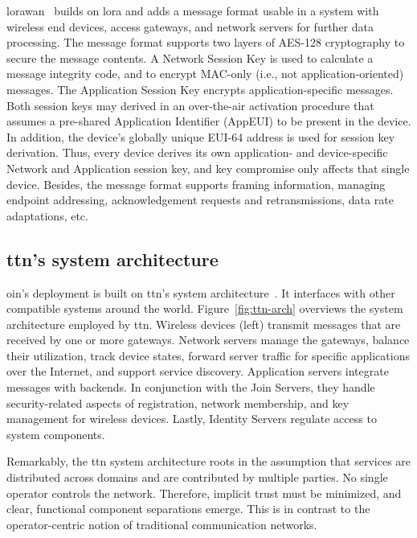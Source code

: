 \gls{lorawan}~\cite{lorawan-specs} builds on \gls{lora} and adds
a message format usable in a system with wireless end devices,
access gateways, and network servers for further data processing.
The message format
supports two layers of AES-128 cryptography to secure
the message contents. A Network Session Key is used to calculate a
message integrity code, and to encrypt MAC-only (i.e., not
application-oriented) messages. The Application Session Key encrypts
application-specific messages. Both session keys may derived in an
over-the-air activation procedure that assumes a pre-shared
Application Identifier (AppEUI) to be present in the device.
In addition, the device's globally unique EUI-64 address is used
for session key derivation. Thus, every device derives its own
application- and device-specific Network and Application session key,
and key compromise only affects that single device.
Besides, the message format supports framing information, managing
endpoint addressing, acknowledgement requests and retransmissions,
data rate adaptations, etc.


\subsection{\gls{ttn}'s system architecture}

\gls{oin}'s deployment is built on \gls{ttn}'s system architecture~\cite{ttn}.
It interfaces with other compatible systems around the world.
Figure~\ref{fig:ttn-arch} overviews the system architecture employed
by \gls{ttn}. Wireless devices (left) transmit messages that are
received by one or more gateways. Network servers manage the gateways,
balance their utilization, track device states, forward server traffic
for specific applications over the Internet, and support service discovery.
Application servers integrate messages with backends. In conjunction
with the Join Servers, they handle security-related aspects of
registration, network membership, and key management for wireless
devices.
Lastly, Identity Servers regulate access to system components.

Remarkably, the \gls{ttn} system architecture roots in the assumption
that services are distributed across domains and are contributed
by multiple parties. No single operator controls the network.
Therefore, implicit trust must be minimized, and clear, functional
component separations emerge.
This is in contrast to the operator-centric notion of traditional
communication networks.


